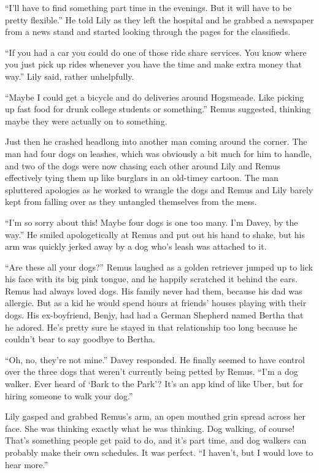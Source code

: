 \documentclass[12pt,twoside,openright]{memoir}
\begin{document}
``I'll have to find something part time in the evenings. But it will have to be pretty flexible.'' He told Lily as they left the hospital and he grabbed a newspaper from a news stand and started looking through the pages for the classifieds.

``If you had a car you could do one of those ride share services. You know where you just pick up rides whenever you have the time and make extra money that way.'' Lily said, rather unhelpfully.

``Maybe I could get a bicycle and do deliveries around Hogsmeade. Like picking up fast food for drunk college students or something.'' Remus suggested, thinking maybe they were actually on to something.

Just then he crashed headlong into another man coming around the corner. The man had four dogs on leashes, which was obviously a bit much for him to handle, and two of the dogs were now chasing each other around Lily and Remus effectively tying them up like burglars in an old-timey cartoon. The man spluttered apologies as he worked to wrangle the dogs and Remus and Lily barely kept from falling over as they untangled themselves from the mess.

``I'm so sorry about this! Maybe four dogs is one too many. I'm Davey, by the way.'' He smiled apologetically at Remus and put out his hand to shake, but his arm was quickly jerked away by a dog who's leash was attached to it.

``Are these all your dogs?'' Remus laughed as a golden retriever jumped up to lick his face with its big pink tongue, and he happily scratched it behind the ears. Remus had always loved dogs. His family never had them, because his dad was allergic. But as a kid he would spend hours at friends' houses playing with their dogs. His ex-boyfriend, Benjy, had had a German Shepherd named Bertha that he adored. He's pretty sure he stayed in that relationship too long because he couldn't bear to say goodbye to Bertha.

``Oh, no, they're not mine.'' Davey responded. He finally seemed to have control over the three dogs that weren't currently being petted by Remus. ``I'm a dog walker. Ever heard of ‘Bark to the Park'? It's an app kind of like Uber, but for hiring someone to walk your dog.'' 

Lily gasped and grabbed Remus's arm, an open mouthed grin spread across her face. She was thinking exactly what he was thinking. Dog walking, of course! That's something people get paid to do, and it's part time, and dog walkers can probably make their own schedules. It was perfect. ``I haven't, but I would love to hear more.'' 
\end{document}
